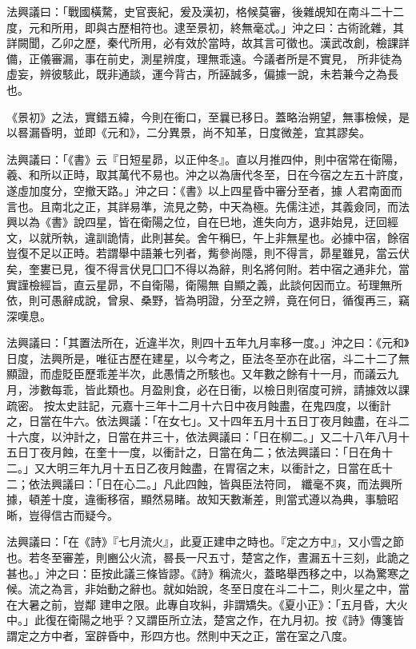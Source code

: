 \begin{pinyinscope}
 法興議曰：「戰國橫騖，史官喪紀，爰及漢初，格候莫審，後雜覘知在南斗二十二度，元和所用，即與古歷相符也。逮至景初，終無毫忒。」沖之曰：古術訛雜，其詳闕聞，乙卯之歷，秦代所用，必有效於當時，故其言可徵也。漢武改創，檢課詳備，正儀審漏，事在前史，測星辨度，理無乖遠。今議者所是不實見，
 所非徒為虛妄，辨彼駭此，既非通談，運今背古，所誣誠多，偏據一說，未若兼今之為長也。



 《景初》之法，實錯五緯，今則在衝口，至曩已移日。蓋略治朔望，無事檢候，是以晷漏昏明，並即《元和》，二分異景，尚不知革，日度微差，宜其謬矣。



 法興議曰：「《書》云『日短星昴，以正仲冬』。直以月推四仲，則中宿常在衛陽，羲、和所以正時，取其萬代不易也。沖之以為唐代冬至，日在今宿之左五十許度，遂虛加度分，空撤天路。」沖之曰：《書》以上四星昏中審分至者，據
 人君南面而言也。且南北之正，其詳易準，流見之勢，中天為極。先儒注述，其義僉同，而法興以為《書》說四星，皆在衛陽之位，自在巳地，進失向方，退非始見，迂回經文，以就所執，違訓詭情，此則甚矣。舍午稱巳，午上非無星也。必據中宿，餘宿豈復不足以正時。若謂舉中語兼七列者，觜參尚隱，則不得言，昴星雖見，當云伏矣，奎婁已見，復不得言伏見囗囗不得以為辭，則名將何附。若中宿之通非允，當實謹檢經旨，直云星昴，不自衛陽，衛陽無
 自顯之義，此談何因而立。茍理無所依，則可愚辭成說，曾泉、桑野，皆為明證，分至之辨，竟在何日，循復再三，竊深嘆息。



 法興議曰：「其置法所在，近違半次，則四十五年九月率移一度。」沖之曰：《元和》日度，法興所是，唯征古歷在建星，以今考之，臣法冬至亦在此宿，斗二十二了無顯證，而虛貶臣歷乖差半次，此愚情之所駭也。又年數之餘有十一月，而議云九月，涉數每乖，皆此類也。月盈則食，必在日衝，以檢日則宿度可辨，請據效以課疏密。
 按太史註記，元嘉十三年十二月十六日中夜月蝕盡，在鬼四度，以衝計之，日當在牛六。依法興議：「在女七」。又十四年五月十五日丁夜月蝕盡，在斗二十六度，以沖計之，日當在井三十，依法興議曰：「日在柳二。」又二十八年八月十五日丁夜月蝕，在奎十一度，以衝計之，日當在角二；依法興議曰：「日在角十二。」又大明三年九月十五日乙夜月蝕盡，在胃宿之末，以衝計之，日當在氐十二；依法興議曰：「日在心二。」凡此四蝕，皆與臣法符同，
 纖毫不爽，而法興所據，頓差十度，違衝移宿，顯然易睹。故知天數漸差，則當式遵以為典，事驗昭晰，豈得信古而疑今。



 法興議曰：「在《詩》『七月流火』，此夏正建申之時也。『定之方中』，又小雪之節也。若冬至審差，則豳公火流，晷長一尺五寸，楚宮之作，晝漏五十三刻，此詭之甚也。」沖之曰：臣按此議三條皆謬。《詩》稱流火，蓋略舉西移之中，以為驚寒之候。流之為言，非始動之辭也。就如始說，冬至日度在斗二十二，則火星之中，當在大暑之前，豈鄰
 建申之限。此專自攻糾，非謂矯失。《夏小正》：「五月昏，大火中。」此復在衛陽之地乎？又謂臣所立法，楚宮之作，在九月初。按《詩》傳箋皆謂定之方中者，室辟昏中，形四方也。然則中天之正，當在室之八度。




\end{pinyinscope}
